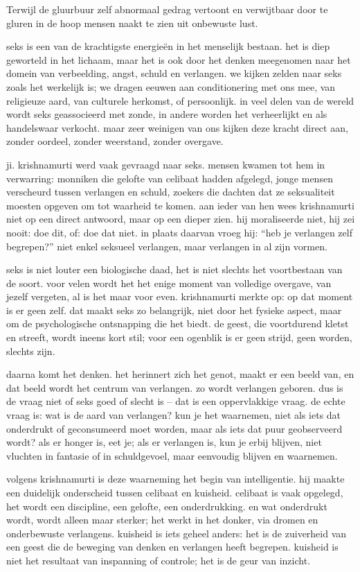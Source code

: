Terwijl de gluurbuur zelf abnormaal gedrag vertoont en verwijtbaar door te gluren in de hoop mensen naakt te zien uit onbewuste lust.

seks is een van de krachtigste energieën in het menselijk bestaan. het is diep geworteld in het lichaam, maar het is ook door het denken meegenomen naar het domein van verbeelding, angst, schuld en verlangen. we kijken zelden naar seks zoals het werkelijk is; we dragen eeuwen aan conditionering met ons mee, van religieuze aard, van culturele herkomst, of persoonlijk. in veel delen van de wereld wordt seks geassocieerd met zonde, in andere worden het verheerlijkt en als handelswaar verkocht. maar zeer weinigen van ons kijken deze kracht direct aan, zonder oordeel, zonder weerstand, zonder overgave.

ji. krishnamurti werd vaak gevraagd naar seks. mensen kwamen tot hem in verwarring: monniken die gelofte van celibaat hadden afgelegd, jonge mensen verscheurd tussen verlangen en schuld, zoekers die dachten dat ze seksualiteit moesten opgeven om tot waarheid te komen. aan ieder van hen wees krishnamurti niet op een direct antwoord, maar op een dieper zien. hij moraliseerde niet, hij zei nooit: doe dit, of: doe dat niet. in plaats daarvan vroeg hij: “heb je verlangen zelf begrepen?” niet enkel seksueel verlangen, maar verlangen in al zijn vormen.

seks is niet louter een biologische daad, het is niet slechts het voortbestaan van de soort. voor velen wordt het het enige moment van volledige overgave, van jezelf vergeten, al is het maar voor even. krishnamurti merkte op: op dat moment is er geen zelf. dat maakt seks zo belangrijk, niet door het fysieke aspect, maar om de psychologische ontsnapping die het biedt. de geest, die voortdurend kletst en streeft, wordt ineens kort stil; voor een ogenblik is er geen strijd, geen worden, slechts zijn.

daarna komt het denken. het herinnert zich het genot, maakt er een beeld van, en dat beeld wordt het centrum van verlangen. zo wordt verlangen geboren. dus is de vraag niet of seks goed of slecht is – dat is een oppervlakkige vraag. de echte vraag is: wat is de aard van verlangen? kun je het waarnemen, niet als iets dat onderdrukt of geconsumeerd moet worden, maar als iets dat puur geobserveerd wordt? als er honger is, eet je; als er verlangen is, kun je erbij blijven, niet vluchten in fantasie of in schuldgevoel, maar eenvoudig blijven en waarnemen.

volgens krishnamurti is deze waarneming het begin van intelligentie. hij maakte een duidelijk onderscheid tussen celibaat en kuisheid. celibaat is vaak opgelegd, het wordt een discipline, een gelofte, een onderdrukking. en wat onderdrukt wordt, wordt alleen maar sterker; het werkt in het donker, via dromen en onderbewuste verlangens. kuisheid is iets geheel anders: het is de zuiverheid van een geest die de beweging van denken en verlangen heeft begrepen. kuisheid is niet het resultaat van inspanning of controle; het is de geur van inzicht.


